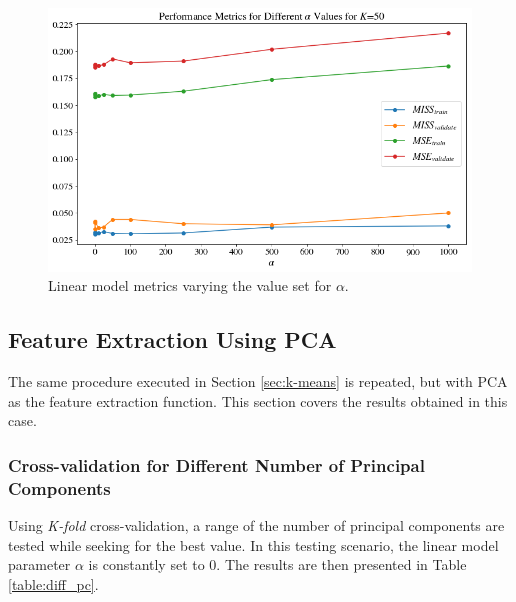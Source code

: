 \documentclass{article}
\begin{document}
\begin{figure}[h!]
    \centering
    \includegraphics[scale=0.42]{images/cv_alpha.png}
    \caption{Linear model metrics varying the value set for $\alpha$.}
    \label{fig:diff_alpha}
\end{figure}

\subsection{Feature Extraction Using PCA}

The same procedure executed in Section \ref{sec:k-means} is repeated, but with PCA as the feature extraction function. This section covers the results obtained in this case.

\subsubsection{Cross-validation for Different Number of Principal Components}

Using \textit{K-fold} cross-validation, a range of the number of principal components are tested while seeking for the best value. In this testing scenario, the linear model parameter $\alpha$ is constantly set to 0. The results are then presented in Table \ref{table:diff_pc}.
\end{document}
